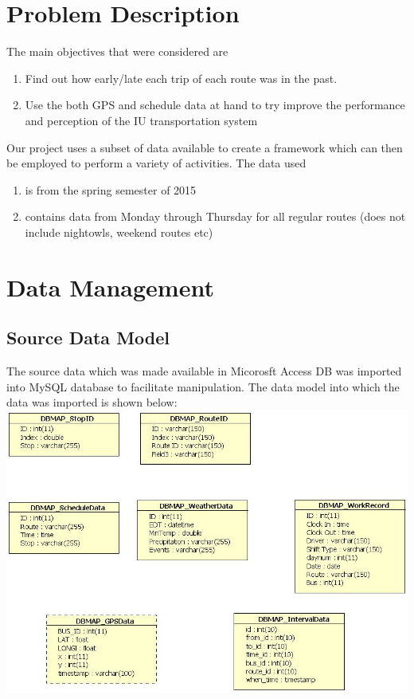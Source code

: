 \documentclass[12pt]{article}\usepackage[]{graphicx}\usepackage[]{color}
\begin{document}
\section{Problem Description}
The main objectives that were considered are
\begin{enumerate}
\item Find out how early/late each trip of each route was in the past. 
\item Use the both GPS and schedule data at hand to try improve the performance and perception of the IU transportation system
\end{enumerate}
Our project uses a subset of data available to create a framework which can then be employed to perform a variety of activities. The data used
\begin{enumerate}
\item is from the spring semester of 2015
\item contains data from Monday through Thursday for all regular routes (does not include nightowls, weekend routes etc)
\end{enumerate}

\section{Data Management}
\subsection{Source Data Model}
The source data which was made available in Micorosft Access DB was imported into MySQL database to facilitate manipulation. The data model into which the data was imported is shown below:\\
\includegraphics[scale=0.5]{resources/dbmap_access}\\[1cm] 
\end{document}

